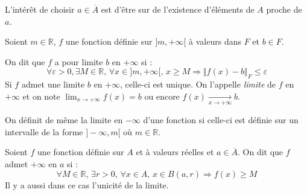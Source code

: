 \documentclass[french,11pt,twoside]{VcCours}
\begin{document}
\begin{Remarque}{} L'intérêt de choisir $a \in \overline{A}$ est d'être sur de l'existence d'éléments de $A$ \og proche \fg de $a$.
\end{Remarque}

\begin{Definition}{} Soient $m \in \mathbb{R}$, $f$ une fonction définie sur $]m, + \infty[$ à valeurs dans $F$ et $b \in F$.

On dit que $f$ a pour limite $b$ en $+ \infty$ si :
$$ \forall \varepsilon>0, \exists M \in \mathbb{R}, \, \forall x \in ]m, + \infty[, \, x \geq M \Rightarrow \Vert f(x)- b \Vert_F \leq \varepsilon$$
 Si $f$ admet une limite $b$ en $+ \infty$, celle-ci est unique. On l'appelle \emph{limite} de $f$ en $+ \infty$ et on note \newline $\lim_{x \rightarrow + \infty} f(x) = b$ ou encore $f(x) \underset{x \rightarrow + \infty}{\rightarrow} b$.
\end{Definition}

\begin{Remarque}{} On définit de même la limite en $- \infty$ d'une fonction si celle-ci est définie sur un intervalle de la forme $]- \infty, m[$ où $m \in \mathbb{R}$.
\end{Remarque}
%
%

\begin{Definition}{} Soient $f$ une fonction définie sur $A$ et à valeurs réelles et $a \in \overline{A}$. On dit que $f$ admet $+ \infty$ en $a$ si :
$$ \forall M \in \mathbb{R}, \, \exists r > 0, \, \forall x \in A, \, x \in B(a,r) \Rightarrow f(x) \geq M$$
Il y a aussi dans ce cas l'unicité de la limite.
\end{Definition}
\end{document}
